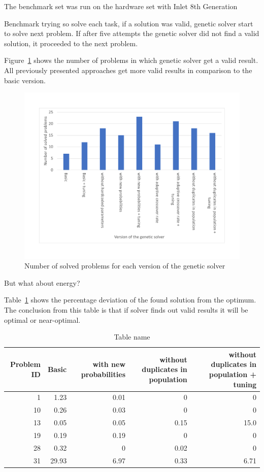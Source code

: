 The benchmark set was run on the hardware set with Inlet 8th Generation 

Benchmark trying so solve each task, if a solution was valid, genetic solver start to solve next problem. If after five attempts the genetic solver did not find a valid solution, it proceeded to the next problem.

Figure~\ref{fig:EvaluationNumberOfSolvedProblems} shows the number of problems in which genetic solver get a valid result.
All previously presented approaches get more valid results in comparison to the basic version.

\begin{figure}
	\centering
	\includegraphics[width=\textwidth]{images/EvaluationNumberOfSolvedProblems.pdf}
	\caption[Number of problems for each version of the genetic solver]{Number of solved problems for each version of the genetic solver}
	\label{fig:EvaluationNumberOfSolvedProblems}
\end{figure}


But what about energy?


Table~\ref{tab:EnergyTable} shows the percentage deviation of the found solution from the optimum.
The conclusion from this table is that if solver finds out valid results it will be optimal or near-optimal.

\begin{table}
	\begin{tabularx}{\textwidth}{@{}rrrrr@{}}
		\toprule
		\textbf{Problem ID} & \textbf{Basic} &
		\textbf{with new probabilities} & \textbf{without duplicates in population} & \textbf{without duplicates in population + tuning} 
		\tabularnewline
		\midrule
		1 & 1.23 & 0.01 & 0 & 0
		\tabularnewline
		10 & 0.26 & 0.03 & 0 & 0
		\tabularnewline
		13 & 0.05 & 0.05 & 0.15 & 15.0
		\tabularnewline
		19 & 0.19 & 0.19 & 0 & 0
		\tabularnewline
		28 & 0.32 & 0 & 0.02 & 0
		\tabularnewline
		31 & 29.93 & 6.97 & 0.33 & 6.71
		\tabularnewline
		\bottomrule
	\end{tabularx}
	\caption{Table name}\label{tab:EnergyTable}
\end{table}

